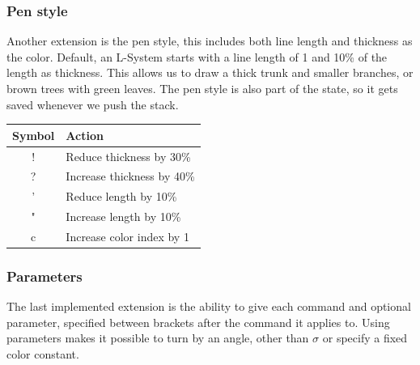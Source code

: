 \documentclass[11pt,a4paper]{article}
\begin{document}
\subsubsection{Pen style}
Another extension is the pen style, this includes both line length and thickness as the color. Default, an L-System starts with a line length of 1 and 10\% of the length as thickness. This allows us to draw a thick trunk and smaller branches, or brown trees with green leaves. The pen style is also part of the state, so it gets saved whenever we push the stack.

\begin{center}
\begin{tabular}{c | l}
Symbol & Action \\ \hline
! & Reduce thickness by 30\% \\
? & Increase thickness by 40\% \\
' & Reduce length by 10\% \\
" & Increase length by 10\% \\
c & Increase color index by 1
\end{tabular}
\end{center}


\subsubsection{Parameters}
The last implemented extension is the ability to give each command and optional parameter, specified between brackets after the command it applies to. Using parameters makes it possible to turn by an angle, other than $\sigma$ or specify a fixed color constant.
\end{document}
